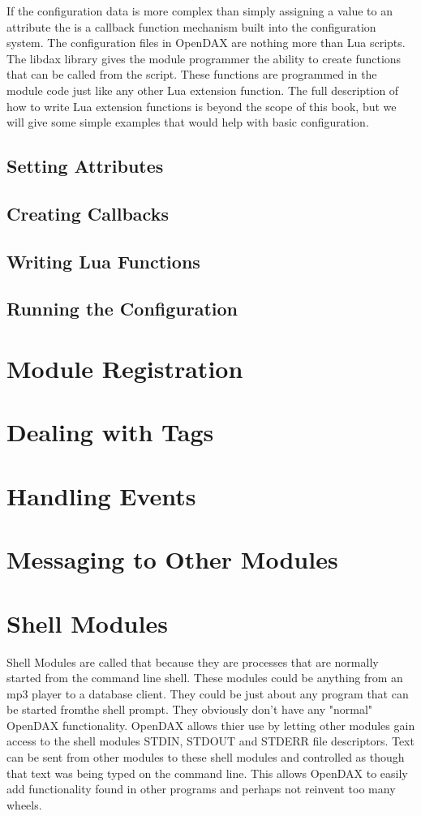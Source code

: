\documentclass[10pt,letterpaper]{report}
\begin{document}
If the configuration data is more complex than simply assigning a value to an attribute the is a callback function mechanism built into the configuration system.  The configuration files in OpenDAX are nothing more than Lua scripts.  The libdax library gives the module programmer the ability to create functions that can be called from the script.  These functions are programmed in the module code just like any other Lua extension function.  The full description of how to write Lua extension functions is beyond the scope of this book, but we will give some simple examples that would help with basic configuration.
\section{Setting Attributes}
\section{Creating Callbacks}
\section{Writing Lua Functions}
\section{Running the Configuration}

\chapter{Module Registration}

\chapter{Dealing with Tags}

\chapter{Handling Events}

\chapter{Messaging to Other Modules}

\chapter{Shell Modules}
Shell Modules are called that because they are processes that are normally started from the command line shell.  These modules could be anything from an mp3 player to a database client.  They could be just about any program that can be started fromthe shell prompt.  They obviously don't have any "normal" OpenDAX functionality.  OpenDAX allows thier use by letting other modules gain access to the shell modules STDIN, STDOUT and STDERR file descriptors.  Text can be sent from other modules to these shell modules and controlled as though that text was being typed on the command line.  This allows OpenDAX to easily add functionality found in other programs and perhaps not reinvent too many wheels.
\end{document}

